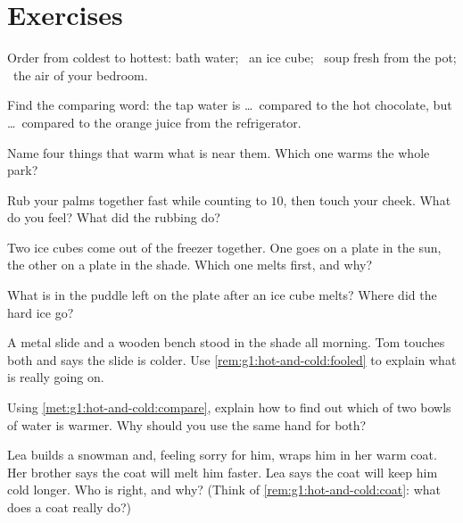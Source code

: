 \section{Exercises}

\begin{exercise}[$\star$]\label{exo:g1:hot-and-cold:1}
Order from coldest to hottest: bath water; \ an ice cube; \ soup
fresh from the pot; \ the air of your bedroom.
\end{exercise}

\begin{exercise}[$\star$]\label{exo:g1:hot-and-cold:2}
Find the comparing word: the tap water is \dots\ compared to the hot
chocolate, but \dots\ compared to the orange juice from the
refrigerator.
\end{exercise}

\begin{exercise}[$\star$]\label{exo:g1:hot-and-cold:3}
Name four things that warm what is near them. Which one warms the
whole park?
\end{exercise}

\begin{exercise}[$\star$]\label{exo:g1:hot-and-cold:4}
Rub your palms together fast while counting to $10$, then touch your
cheek. What do you feel? What did the rubbing do?
\end{exercise}

\begin{exercise}[$\star$]\label{exo:g1:hot-and-cold:5}
Two ice cubes come out of the freezer together. One goes on a plate
in the sun, the other on a plate in the shade. Which one melts first,
and why?
\end{exercise}

\begin{exercise}[$\star$]\label{exo:g1:hot-and-cold:6}
What is in the puddle left on the plate after an ice cube melts?
Where did the hard ice go?
\end{exercise}

\begin{exercise}[$\star$]\label{exo:g1:hot-and-cold:7}
A metal slide and a wooden bench stood in the shade all morning. Tom
touches both and says the slide is colder. Use
\cref{rem:g1:hot-and-cold:fooled} to explain what is really going on.
\end{exercise}

\begin{exercise}[$\star$]\label{exo:g1:hot-and-cold:8}
Using \cref{met:g1:hot-and-cold:compare}, explain how to find out
which of two bowls of water is warmer. Why should you use the same
hand for both?
\end{exercise}

\begin{exercise}[$\star\star$]\label{exo:g1:hot-and-cold:9}
Lea builds a snowman and, feeling sorry for him, wraps him in her
warm coat. Her brother says the coat will melt him faster. Lea says
the coat will keep him cold longer. Who is right, and why? (Think of
\cref{rem:g1:hot-and-cold:coat}: what does a coat really do?)
\end{exercise}
